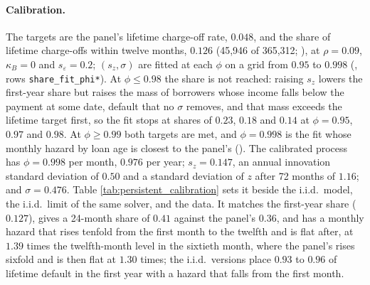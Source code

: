 \paragraph{Calibration.} The targets are the panel's lifetime charge-off rate, $0.048$, and the share of lifetime charge-offs within twelve months, $0.126$ (45,946 of 365,312; ), at $\rho = 0.09$, $\kappa_B = 0$ and $s_\varepsilon = 0.2$; $(s_z, \sigma)$ are fitted at each $\phi$ on a grid from $0.95$ to $0.998$ (, rows \texttt{share\_fit\_phi*}). At $\phi \le 0.98$ the share is not reached: raising $s_z$ lowers the first-year share but raises the mass of borrowers whose income falls below the payment at some date, default that no $\sigma$ removes, and that mass exceeds the lifetime target first, so the fit stops at shares of $0.23$, $0.18$ and $0.14$ at $\phi = 0.95$, $0.97$ and $0.98$. At $\phi \ge 0.99$ both targets are met, and $\phi = 0.998$ is the fit whose monthly hazard by loan age is closest to the panel's (). The calibrated process has $\phi = 0.998$ per month, $0.976$ per year; $s_z = 0.147$, an annual innovation standard deviation of $0.50$ and a standard deviation of $z$ after 72 months of $1.16$; and $\sigma = 0.476$. Table \ref{tab:persistent_calibration} sets it beside the i.i.d.\ model, the i.i.d.\ limit of the same solver, and the data. It matches the first-year share ($0.127$), gives a 24-month share of $0.41$ against the panel's $0.36$, and has a monthly hazard that rises tenfold from the first month to the twelfth and is flat after, at $1.39$ times the twelfth-month level in the sixtieth month, where the panel's rises sixfold and is then flat at $1.30$ times; the i.i.d.\ versions place $0.93$ to $0.96$ of lifetime default in the first year with a hazard that falls from the first month.

